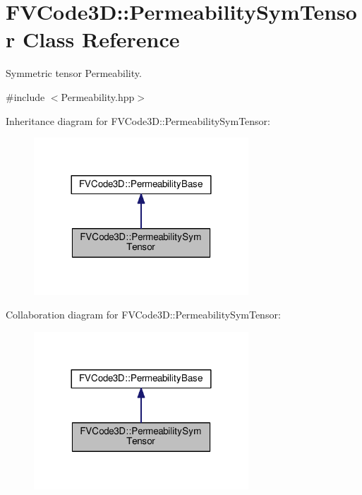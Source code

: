 \hypertarget{classFVCode3D_1_1PermeabilitySymTensor}{}\section{F\+V\+Code3D\+:\+:Permeability\+Sym\+Tensor Class Reference}
\label{classFVCode3D_1_1PermeabilitySymTensor}


Symmetric tensor Permeability.  




{\ttfamily \#include $<$Permeability.\+hpp$>$}



Inheritance diagram for F\+V\+Code3D\+:\+:Permeability\+Sym\+Tensor\+:
\nopagebreak
\begin{figure}[H]
\begin{center}
\leavevmode
\includegraphics[width=228pt]{classFVCode3D_1_1PermeabilitySymTensor__inherit__graph}
\end{center}
\end{figure}


Collaboration diagram for F\+V\+Code3D\+:\+:Permeability\+Sym\+Tensor\+:
\nopagebreak
\begin{figure}[H]
\begin{center}
\leavevmode
\includegraphics[width=228pt]{classFVCode3D_1_1PermeabilitySymTensor__coll__graph}
\end{center}
\end{figure}
